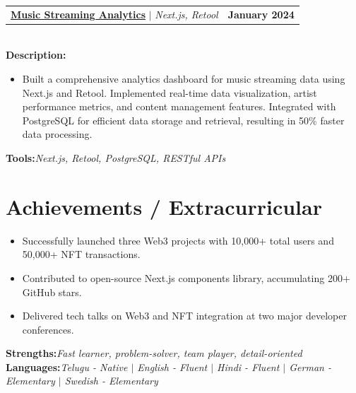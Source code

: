 \documentclass[letterpaper,11pt]{article}
\makeatletter
\newcommand{\resumeItem}[1]{
  \item\small{
    {#1 \vspace{-2pt}}
  }
}
\newcommand{\resumeProjectHeading}[2]{
    \item
    \begin{tabular*}{1.001\textwidth}{l@{\extracolsep{\fill}}r}
      \small#1 & \textbf{\small #2}\\
    \end{tabular*}\vspace{-7pt}
}
\newcommand{\resumeSubHeadingListStart}{\begin{itemize}[leftmargin=0.0in, label={}]}
\newcommand{\resumeSubHeadingListEnd}{\end{itemize}}
\newcommand{\resumeItemListStart}{\begin{itemize}}
\newcommand{\resumeItemListEnd}{\end{itemize}\vspace{-5pt}}
\makeatother
\begin{document}
\resumeProjectHeading
{\href{https://github.com/yakkshit/stream-dashboard}{\textbf{Music Streaming Analytics}} $|$ \emph{Next.js, Retool}}{January 2024}\\
\vspace{6pt}
\textbf{Description:}
\vspace{-5pt}
\resumeItemListStart
\resumeItem{Built a comprehensive analytics dashboard for music streaming data using Next.js and Retool. Implemented real-time data visualization, artist performance metrics, and content management features. Integrated with PostgreSQL for efficient data storage and retrieval, resulting in 50\% faster data processing.}
\resumeItemListEnd
\vspace{4pt}
\textbf{Tools:}\emph{Next.js, Retool, PostgreSQL, RESTful APIs}
\vspace{-12pt}

\section{Achievements / Extracurricular}
\resumeSubHeadingListStart
\resumeItemListStart
\resumeItem{Successfully launched three Web3 projects with 10,000+ total users and 50,000+ NFT transactions.}
\resumeItem{Contributed to open-source Next.js components library, accumulating 200+ GitHub stars.}
\resumeItem{Delivered tech talks on Web3 and NFT integration at two major developer conferences.}
\resumeItemListEnd

\resumeSubHeadingListEnd
\textbf{Strengths:}\emph{Fast learner, problem-solver, team player, detail-oriented} \\
\textbf{Languages:}\emph{Telugu - Native $|$ English - Fluent $|$ Hindi - Fluent $|$ German - Elementary $|$ Swedish - Elementary}

\vspace{10pt}
\end{document}
